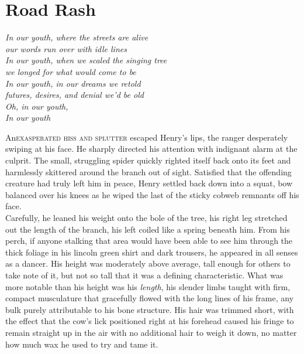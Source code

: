 \chapter{Road Rash}
\begin{center}
\textit{In our youth, where the streets are alive\\ our words run over with idle lines\\ In our youth, when we scaled the singing tree \\ we longed for what would come to be \\ In our youth, in our dreams we retold \\ futures, desires, and denial we'd be old \\ Oh, in our youth, \\ In our youth}
\end{center}
\lettrine{An}{exasperated hiss and splutter} escaped Henry's lips, the ranger desperately swiping at his face. 
He sharply directed his attention with indignant alarm at the culprit.
The small, struggling spider quickly righted itself back onto its feet and harmlessly skittered around the branch out of sight.
Satisfied that the offending creature had truly left him in peace, Henry settled back down into a squat, bow balanced over his knees as he wiped the last of the sticky cobweb remnants off his face.\\

Carefully, he leaned his weight onto the bole of the tree, his right leg stretched out the length of the branch, his left coiled like a spring beneath him.
From his perch, if anyone stalking that area would have been able to see him through the thick foliage in his lincoln green shirt and dark trousers, he appeared in all senses as a dancer.
His height was moderately above average, tall enough for others to take note of it, but not so tall that it was a defining characteristic. 
What was more notable than his height was his \textit{length}, his slender limbs taught with firm, compact musculature that gracefully flowed with the long lines of his frame, any bulk purely attributable to his bone structure.
His hair was trimmed short, with the effect that the cow's lick positioned right at his forehead caused his fringe to remain straight up in the air with no additional hair to weigh it down, no matter how much wax he used to try and tame it.\\

